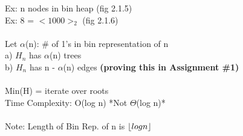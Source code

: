 \documentclass{article}
\DeclarePairedDelimiter\floor{\lfloor}{\rfloor}
\begin{document}
		 Ex: n nodes in bin heap (fig 2.1.5)\\
		 Ex: 8 = $< 1000 >_2$ (fig 2.1.6)\\\\
		 Let $\alpha$(n): \# of 1's in bin representation of n\\
		 a) $H_n$ has $\alpha$(n) trees\\
		 b) $H_n$ has n - $\alpha$(n) edges \textbf{(proving this in Assignment \#1)}\\\\
		 Min(H) = iterate over roots\\
		 Time Complexity: O(log n) *Not $\Theta$(log n)*\\\\
		 Note: Length of Bin Rep. of n is $\floor{log n}$\\
		 
\end{document}
